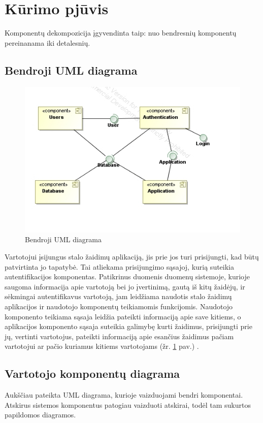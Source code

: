 \documentclass{VUMIFPSkursinis}
\begin{document}
\section{Kūrimo pjūvis}
Komponentų dekompozicija įgyvendinta taip: nuo bendresnių komponentų pereinanama iki detalesnių.

	\subsection{Bendroji UML diagrama}
		\begin{figure}[H]
			\centering
			\includegraphics[scale=0.6]{img/UMLComponent1}
			\caption{Bendroji UML diagrama}
			\label{img:UMLComponent1}
		\end{figure}
		Vartotojui įsijungus stalo žaidimų aplikaciją, jis prie jos turi prisijungti, kad būtų patvirtinta jo tapatybė. Tai atliekama prisijungimo sąsajoj, kurią suteikia autentifikacijos komponentas. Patikrinus duomenis duomenų sistemoje, kurioje saugoma informacija apie vartotoją bei jo įvertinimą, gautą iš kitų žaidėjų, ir sėkmingai autentifikavus vartotoją, jam leidžiama naudotis stalo žaidimų aplikacijos ir naudotojo komponentų teikiamomis funkcijomis. Naudotojo komponento teikiama sąsaja leidžia pateikti informaciją apie save kitiems, o aplikacijos komponento sąsaja suteikia galimybę kurti žaidimus, prisijungti prie jų, vertinti vartotojus, pateikti informaciją apie esančius žaidimus pačiam vartotojui ar pačio kuriamus kitiems vartotojams (žr. \ref{img:UMLComponent1} pav.) .
		
		\subsection{Vartotojo komponentų diagrama}
		Aukščiau pateikta UML diagrama, kurioje vaizduojami bendri komponentai. Atskirus sistemos komponentus patogiau vaizduoti atskirai, todėl tam sukurtos papildomos diagramos.
		
\end{document}
